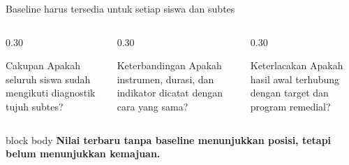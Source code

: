 \begin{frame}{Baseline harus tersedia untuk setiap siswa dan subtes}
  \begin{columns}[T,onlytextwidth]
    \begin{column}{0.30\textwidth}
      \begin{block}{Cakupan}
        Apakah seluruh siswa sudah mengikuti diagnostik tujuh subtes?
      \end{block}
    \end{column}
    \begin{column}{0.30\textwidth}
      \begin{block}{Keterbandingan}
        Apakah instrumen, durasi, dan indikator dicatat dengan cara yang sama?
      \end{block}
    \end{column}
    \begin{column}{0.30\textwidth}
      \begin{block}{Keterlacakan}
        Apakah hasil awal terhubung dengan target dan program remedial?
      \end{block}
    \end{column}
  \end{columns}
  \vspace{0.10cm}
  \begin{beamercolorbox}[rounded=true,sep=0.16cm,wd=\textwidth]{block body}
    \centering\bfseries Nilai terbaru tanpa baseline menunjukkan posisi, tetapi belum menunjukkan kemajuan.
  \end{beamercolorbox}
\end{frame}

